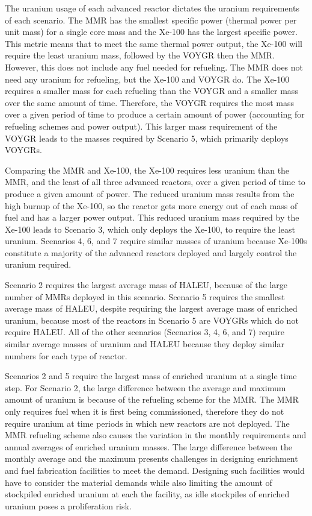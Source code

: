 The uranium usage of each advanced reactor dictates the uranium requirements 
of each scenario. The \gls{MMR} has the smallest specific power (thermal 
power per unit mass) for a single core mass and the Xe-100 has the largest 
specific power. This metric means that to meet the same thermal power 
output, the Xe-100 will require the least uranium mass, followed by the 
VOYGR then the \gls{MMR}. However, this does not include any fuel needed for 
refueling. The \gls{MMR} does not need any uranium for refueling, but the 
Xe-100 and VOYGR do. The Xe-100 requires a smaller mass for each refueling 
than the VOYGR and a smaller mass over the same amount of time. Therefore, 
the VOYGR requires the most mass over a given period of time to produce 
a certain amount of power (accounting for refueling schemes and power  
output). This larger mass requirement of the VOYGR leads to the 
masses required by Scenario 5, 
which primarily deploys VOYGRs.

Comparing the \gls{MMR} and Xe-100, the Xe-100 requires less uranium than 
the \gls{MMR},
and the least of all three advanced reactors, over a given period of time 
to produce a given amount of power. The reduced uranium mass results 
from the high burnup of the Xe-100, so the reactor gets more energy out of 
each mass of fuel and has a larger power output. This reduced uranium mass 
required by the Xe-100 leads to Scenario 3, which only deploys the 
Xe-100, to require the least uranium. Scenarios 4, 6, and 7 require similar 
masses of uranium because Xe-100s constitute a majority of the advanced 
reactors deployed and largely control the uranium required. 

Scenario 2 requires the largest average mass of \gls{HALEU}, because 
of the large number of \glspl{MMR} deployed in this scenario. Scenario 
5 requires the smallest average mass of \gls{HALEU}, despite requiring the 
largest average mass of enriched uranium, because most of the 
reactors in Scenario 5 are VOYGRs which do not require \gls{HALEU}. 
All of the other scenarios (Scenarios 3, 4, 6, and 7) require similar 
average masses of uranium and \gls{HALEU} because they deploy similar 
numbers for each type of reactor. 

Scenarios 2 and 5 require the largest mass of enriched uranium at a single 
time step. For Scenario 2, the large difference between the average and 
maximum amount of uranium is because of the refueling scheme for the 
\gls{MMR}. The \gls{MMR} only requires fuel when it is first being 
commissioned, therefore they do not require uranium at time periods in 
which
new reactors are not deployed. The \gls{MMR} refueling scheme also 
causes the variation in the monthly requirements and annual averages of 
enriched uranium masses. The large difference between the 
monthly average and the maximum presents challenges in designing enrichment 
and fuel fabrication facilities 
to meet the demand. Designing such facilities would have to consider the 
material demands while also limiting the amount of stockpiled enriched 
uranium at each the facility, as idle stockpiles of enriched uranium 
poses a proliferation risk. 

